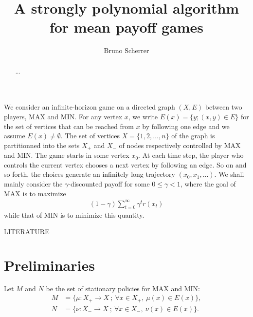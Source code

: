 \documentclass{article}
\title{A strongly polynomial algorithm for mean payoff games}
\author{Bruno Scherrer}
\begin{document}
\maketitle

\begin{abstract}
...
\end{abstract}
  
We consider an infinite-horizon game on a directed graph $(X,E)$ between two players, MAX and MIN. For any vertex $x$, we write $E(x)=\{y;(x,y) \in E\}$ for the set of vertices that can be reached from $x$ by following one edge and we assume $E(x)\neq\emptyset$.  The set of vertices $X=\{1,2,\dots,n\}$ of the graph is partitionned into the sets $X_+$ and $X_-$ of nodes respectively controlled by MAX and MIN. The game starts in some vertex $x_0$. At each time step, the player who controls the current vertex chooses a next vertex by following an edge. So on and so forth, the choices generate an infinitely long trajectory $(x_0,x_1,\dots)$. We shall mainly consider the $\gamma$-discounted payoff for some $0\le\gamma<1$, where the goal of MAX is to maximize
\begin{align}
(1-\gamma)\sum_{t=0}^{\infty} \gamma^t r(x_t)
\end{align}
while that of MIN is to minimize this quantity.

LITERATURE

\section{Preliminaries}

Let $M$ and $N$ be the set of stationary policies for MAX and MIN:
\begin{align}
  M &= \{ \mu:X_+ \to X ~;~ \forall x\in X_+,~ \mu(x) \in E(x) \}, \\
  N & =\{ \nu:X_- \to X ~;~ \forall x\in X_-,~ \nu(x) \in E(x) \}.
\end{align}
\end{document}
